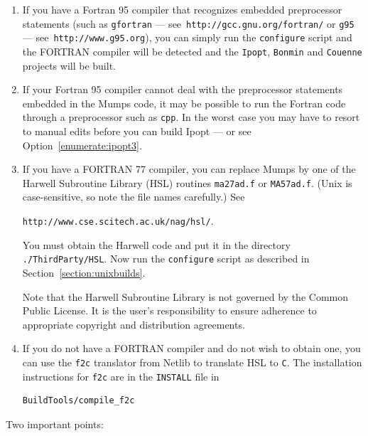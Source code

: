 \documentclass[11pt]{article}
\renewcommand{\_}{{\char"5F}}
\renewcommand{\{}{{\char"7B}}
\renewcommand{\}}{{\char"7D}}
\renewcommand{\^}{{\char"0D}}
\renewcommand{\'}{{\char"0D}}
\newif\ifipopt  \ipopttrue      %
\newcommand{\UrlGgs}{http://www.g95.org}
\newcommand{\UrlGfortran}{http://gcc.gnu.org/fortran/}
\newcommand{\UrlHsl}{http://www.cse.scitech.ac.uk/nag/hsl/}
\begin{document}
\begin{enumerate}[{Option} 1.]

\item{}   If you \ifipopt\else are building in a Unix-like environment and \fi have a Fortran 95 compiler that
recognizes embedded preprocessor statements (such as {\tt gfortran} --- see~{\tt\UrlGfortran}
or {\tt g95} --- see~{\tt\UrlGgs}), you can simply run the {\tt configure} script and the FORTRAN
compiler will be detected and the {\tt Ipopt}, {\tt Bonmin} and {\tt Couenne} projects will be built.

\item{}   If your Fortran 95 compiler cannot deal with the preprocessor statements embedded in the
Mumps code, it may be possible to run the Fortran code through a preprocessor such as {\tt cpp}.
In the worst case you may have to resort to manual edits before you can build Ipopt --- or see 
Option~\ref{enumerate:ipopt3}.

\item{} \label{enumerate:ipopt3}
If you have a FORTRAN 77 compiler, you can replace Mumps by one of the Harwell Subroutine Library (HSL)%
 routines {\tt ma27ad.f} or {\tt MA57ad.f}. 
(Unix is case-sensitive, so note the file names carefully.) See

{\tt\UrlHsl}.  

You must obtain the Harwell code and put it in the directory {\tt \../ThirdParty/HSL}.  
Now run the {\tt configure} script as described in Section~\ref{section:unixbuilds}.

Note that the Harwell Subroutine Library is not governed by the Common Public License. It is the user's responsibility
to ensure adherence to appropriate copyright and distribution agreements.

\item{} \label{enumerate:ipopt4}
If you do not have a FORTRAN compiler and do not wish to obtain one, you can use the {\tt f2c}
translator from Netlib to translate HSL to {\tt C}.  The installation instructions for {\tt f2c}
are in the {\tt INSTALL} file in
\begin{verbatim}
BuildTools/compile_f2c
\end{verbatim}

\end{enumerate}

\noindent Two important points:
\end{document}
